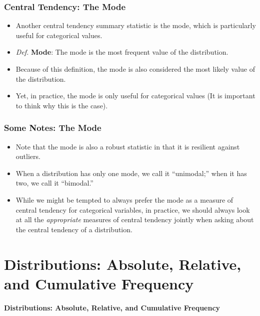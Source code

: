 \documentclass[handout]{beamer} %
\newcommand{\transitionslide}[1]{
    \begin{frame}[plain]
          \addtocounter{framenumber}{-1}
        \centering
        \vspace{1cm}
        \Huge
        \textcolor{moonstoneblue!150}{\textbf{#1}}
    \end{frame}
}
\begin{document}
\begin{frame}
\frametitle{Central Tendency: The Mode}
\begin{itemize}
\item Another central tendency summary statistic is the mode, which is particularly useful for categorical values.
\item \emph{Def.} \textbf{Mode}: The mode is the most frequent value of the distribution.
\item Because of this definition, the mode is also considered the most likely value of the distribution.
\item Yet, in practice, the mode is only useful for categorical values (It is important to think why this is the case).
\end{itemize}
\end{frame}

\begin{frame}
\frametitle{Some Notes: The Mode}
\begin{itemize}
\item Note that the mode is also a robust statistic in that it is resilient against outliers.
\item When a distribution has only one mode, we call it “unimodal;” when it has two, we call it “bimodal.”
\item While we might be tempted to always prefer the mode as a measure of central tendency for categorical variables, in practice, we should always look at all the \emph{appropriate} measures of central tendency jointly when asking about the central tendency of a distribution.
\end{itemize}
\end{frame}


\section{Distributions: Absolute, Relative, and Cumulative Frequency}
\transitionslide{Distributions: Absolute, Relative, and Cumulative Frequency}
\end{document}
